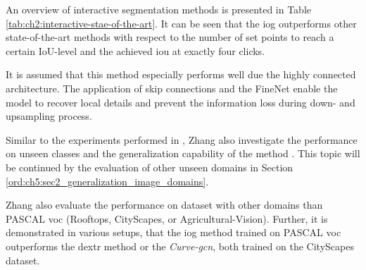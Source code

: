 An overview of interactive segmentation methods is presented in Table \ref{tab:ch2:interactive-stae-of-the-art}.
It can be seen that the \gls{iog} outperforms other state-of-the-art methods with respect to the number of set points to reach a certain IoU-level and the achieved \gls{iou} at exactly four clicks.

It is assumed that this method especially performs well due the highly connected architecture.
The application of skip connections and the FineNet enable the model to recover local details and prevent the information loss during down- and upsampling process.

Similar to the experiments performed in \cite{Man18-DEXTR}, Zhang \etal also investigate the performance on unseen classes and the generalization capability of the method \Cite{Zha20-IOG}. 
This topic will be continued by the evaluation of other unseen domains in Section \ref{ord:ch5:sec2_generalization_image_domains}.

Zhang \etal also evaluate the performance on dataset with other domains than PASCAL \gls{voc} (\eg Rooftops, CityScapes, or Agricultural-Vision).
Further, it is demonstrated in various setups, that the \gls{iog} method trained on PASCAL \gls{voc} outperforms the \gls{dextr} method or the \textit{Curve-\gls{gcn}}, both trained on the CityScapes dataset.

